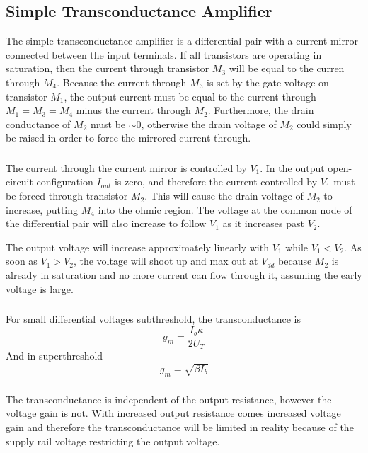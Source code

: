 \subsection{Simple Transconductance Amplifier}
The simple transconductance amplifier is a differential pair with a current mirror connected between the input terminals. If all transistors are
operating in saturation, then the current through transistor \(M_3\) will be equal to the curren through \(M_4\). Because the current through \(M_3\)
is set by the gate voltage on transistor \(M_1\), the output current must be equal to the current through \(M_1=M_3=M_4\) minus the current through \(M_2\).
Furthermore, the drain conductance of \(M_2\) must be \(\sim 0\), otherwise the drain voltage of \(M_2\) could simply be raised in order to force the
mirrored current through.
\subsubsection{}
The current through the current mirror is controlled by \(V_1\). In the output open-circuit configuration \(I_{out}\) is zero, and therefore the 
current controlled by \(V_1\) must be forced through transistor \(M_2\). This will cause the drain voltage of \(M_2\) to increase, putting \(M_4\) 
into the ohmic region. The voltage at the common node of the differential pair will also increase to follow \(V_1\) as it increases past \(V_2\).

The output voltage will increase approximately linearly with \(V_1\) while \(V_1 < V_2\). As soon as \(V_1>V_2\), the voltage will shoot up and max out
at \(V_{dd}\) because \(M_2\) is already in saturation and no more current can flow through it, assuming the early voltage is large.
\subsubsection{}
For small differential voltages subthreshold, the transconductance is
\begin{equation*}
    g_m=\frac{I_b\kappa}{2U_T}
\end{equation*}
And in superthreshold 
\begin{equation*}
    g_m=\sqrt{\beta I_b}
\end{equation*}
\subsubsection{}
The transconductance is independent of the output resistance, however the voltage gain is not. With increased output resistance comes increased voltage gain
and therefore the transconductance will be limited in reality because of the supply rail voltage restricting the output voltage.

